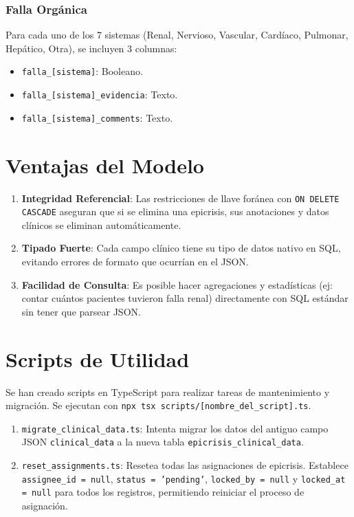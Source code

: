 \documentclass{article}
\begin{document}
\subsubsection{Falla Orgánica}
Para cada uno de los 7 sistemas (Renal, Nervioso, Vascular, Cardíaco, Pulmonar, Hepático, Otra), se incluyen 3 columnas:
\begin{itemize}
    \item \texttt{falla\_[sistema]}: Booleano.
    \item \texttt{falla\_[sistema]\_evidencia}: Texto.
    \item \texttt{falla\_[sistema]\_comments}: Texto.
\end{itemize}

\section{Ventajas del Modelo}
\begin{enumerate}
    \item \textbf{Integridad Referencial}: Las restricciones de llave foránea con \texttt{ON DELETE CASCADE} aseguran que si se elimina una epicrisis, sus anotaciones y datos clínicos se eliminan automáticamente.
    \item \textbf{Tipado Fuerte}: Cada campo clínico tiene su tipo de datos nativo en SQL, evitando errores de formato que ocurrían en el JSON.
    \item \textbf{Facilidad de Consulta}: Es posible hacer agregaciones y estadísticas (ej: contar cuántos pacientes tuvieron falla renal) directamente con SQL estándar sin tener que parsear JSON.
\end{enumerate}

\section{Scripts de Utilidad}
Se han creado scripts en TypeScript para realizar tareas de mantenimiento y migración. Se ejecutan con \texttt{npx tsx scripts/[nombre\_del\_script].ts}.

\begin{enumerate}
    \item \texttt{migrate\_clinical\_data.ts}: Intenta migrar los datos del antiguo campo JSON \texttt{clinical\_data} a la nueva tabla \texttt{epicrisis\_clinical\_data}.
    \item \texttt{reset\_assignments.ts}: Resetea todas las asignaciones de epicrisis. Establece \texttt{assignee\_id = null}, \texttt{status = 'pending'}, \texttt{locked\_by = null} y \texttt{locked\_at = null} para todos los registros, permitiendo reiniciar el proceso de asignación.
\end{enumerate}
\end{document}
